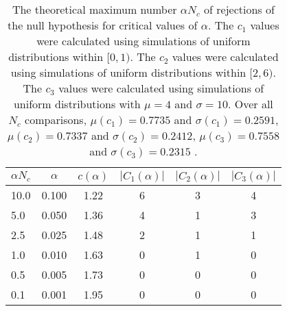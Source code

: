 \begin{table}[h!]
\begin{center}
\begin{tabular}{| l | c | c | c | c | c |}\hline
$\alpha N_c$ & $\alpha$ & $c(\alpha)$ & $|C_1(\alpha)|$ & $|C_2(\alpha)|$ & $|C_3(\alpha)|$ \\\hline\hline
10.0 & 0.100 & 1.22 & 6 & 3 & 4 \\\hline
5.0 & 0.050 & 1.36 & 4 & 1 & 3 \\\hline
2.5 & 0.025 & 1.48 & 2 & 1 & 1 \\\hline
1.0 & 0.010 & 1.63 & 0 & 1 & 0 \\\hline
0.5 & 0.005 & 1.73 & 0 & 0 & 0 \\\hline
0.1 & 0.001 & 1.95 & 0 & 0 & 0 \\\hline
\end{tabular}
\caption{The theoretical maximum number $\alpha N_c$ of rejections
of the null hypothesis for critical values of $\alpha$.
The $c_1$ values were calculated using simulations of uniform distributions within $[0,1)$.
The $c_2$ values were calculated using simulations of uniform distributions within $[2,6)$.
The $c_3$ values were calculated using simulations of uniform distributions with $\mu=4$ and $\sigma=10$.
Over all $N_c$ comparisons,
 $\mu(c_1)=0.7735$ and $\sigma(c_1)=0.2591$,
 $\mu(c_2)=0.7337$ and $\sigma(c_2)=0.2412$,
 $\mu(c_3)=0.7558$ and $\sigma(c_3)=0.2315$ .
}
\end{center}
\end{table}